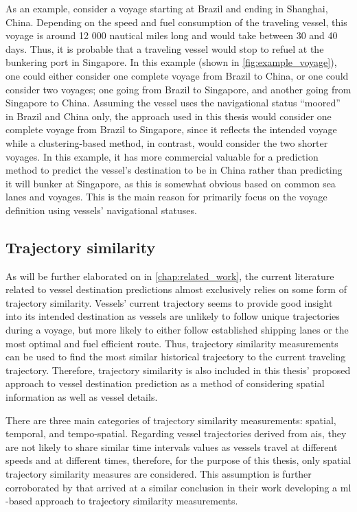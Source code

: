As an example, consider a voyage starting at Brazil and ending in Shanghai, China. Depending on the speed and fuel consumption of the traveling vessel, this voyage is around 12 000 nautical miles long and would take between 30 and 40 days. Thus, it is probable that a traveling vessel would stop to refuel at the bunkering port in Singapore. In this example (shown in \cref{fig:example_voyage}), one could either consider one complete voyage from Brazil to China, or one could consider two voyages; one going from Brazil to Singapore, and another going from Singapore to China. Assuming the vessel uses the navigational status ``moored'' in Brazil and China only, the approach used in this thesis would consider one complete voyage from Brazil to Singapore, since it reflects the intended voyage while a clustering-based method, in contrast, would consider the two shorter voyages. In this example, it has more commercial valuable for a prediction method to predict the vessel's destination to be in China rather than predicting it will bunker at Singapore, as this is somewhat obvious based on common sea lanes and voyages. This is the main reason for primarily focus on the voyage definition using vessels' navigational statuses.

\subsection{Trajectory similarity}
\label{sec:trajectory_similarity}

As will be further elaborated on in \cref{chap:related_work}, the current literature related to vessel destination predictions almost exclusively relies on some form of trajectory similarity. Vessels' current trajectory seems to provide good insight into its intended destination as vessels are unlikely to follow unique trajectories during a voyage, but more likely to either follow established shipping lanes or the most optimal and fuel efficient route. Thus, trajectory similarity measurements can be used to find the most similar historical trajectory to the current traveling trajectory. Therefore, trajectory similarity is also included in this thesis' proposed approach to vessel destination prediction as a method of considering spatial information as well as vessel details.

There are three main categories of trajectory similarity measurements: spatial, temporal, and tempo-spatial. Regarding vessel trajectories derived from \acrshort{ais}, they are not likely to share similar time intervals values as vessels travel at different speeds and at different times, therefore, for the purpose of this thesis, only spatial trajectory similarity measures are considered. This assumption is further corroborated by \cite{Zhang2020AISApproach} that arrived at a similar conclusion in their work developing a \acrfull{ml} -based approach to trajectory similarity measurements.

